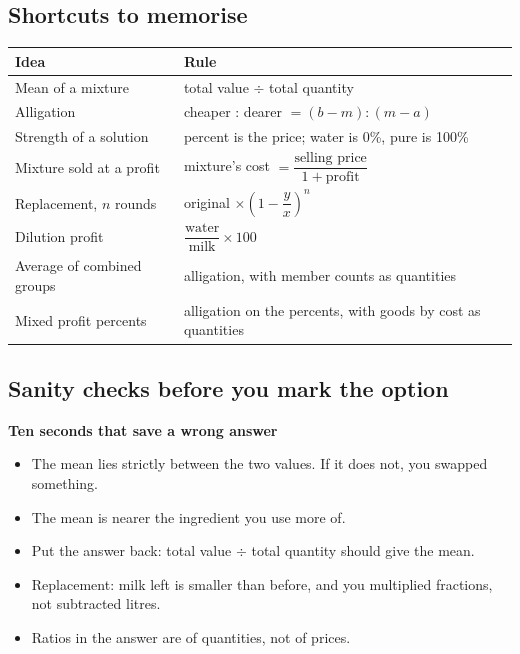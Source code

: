 \documentclass[11pt,a4paper]{article}
\let\oldsubsection\subsection
\renewcommand{\subsection}{\needspace{9\baselineskip}\oldsubsection}
\newcommand{\infobox}[2]{\par\medskip\noindent\begingroup\setlength{\fboxsep}{7pt}%
  \colorbox{codebg}{\parbox{\dimexpr\linewidth-14pt\relax}{\textbf{\color{ember}#1}\par\smallskip #2}}\endgroup\par\medskip}
\begin{document}
\subsection*{Shortcuts to memorise}
\begin{center}\small\renewcommand{\arraystretch}{1.9}\setlength{\tabcolsep}{8pt}
\begin{tabularx}{\linewidth}{@{}>{\raggedright\arraybackslash}X>{\raggedright\arraybackslash}X@{}}
\toprule
\textbf{\color{slate}Idea} & \textbf{\color{slate}Rule} \\ \midrule
Mean of a mixture & total value $\div$ total quantity \\
Alligation & cheaper : dearer $=(b-m):(m-a)$ \\
Strength of a solution & percent is the price; water is 0\%, pure is 100\% \\
Mixture sold at a profit & mixture's cost $=\dfrac{\text{selling price}}{1+\text{profit}}$ \\
Replacement, $n$ rounds & original $\times\left(1-\dfrac{y}{x}\right)^n$ \\
Dilution profit & $\dfrac{\text{water}}{\text{milk}}\times 100$ \\
Average of combined groups & alligation, with member counts as quantities \\
Mixed profit percents & alligation on the percents, with goods by cost as quantities \\
\bottomrule
\end{tabularx}\end{center}

\subsection*{Sanity checks before you mark the option}
\infobox{Ten seconds that save a wrong answer}{
\begin{itemize}
\item The mean lies strictly between the two values. If it does not, you swapped something.
\item The mean is nearer the ingredient you use more of.
\item Put the answer back: total value $\div$ total quantity should give the mean.
\item Replacement: milk left is smaller than before, and you multiplied fractions, not subtracted litres.
\item Ratios in the answer are of quantities, not of prices.
\end{itemize}}
\end{document}
